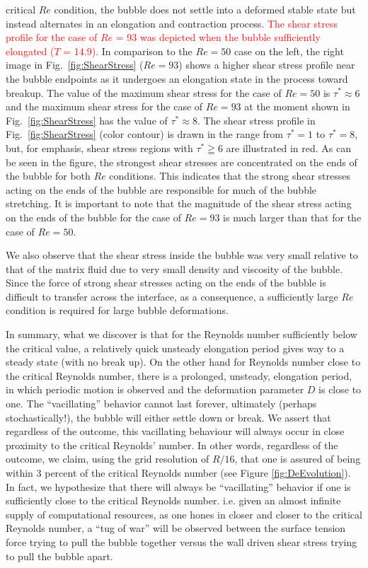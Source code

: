 \documentclass{elsarticle}
\begin{document}
critical $Re$ condition, the bubble does not settle into a deformed stable state but instead alternates in an elongation and 
contraction process.  
\textcolor{red}
{
The shear stress profile for the case of $Re$ = 93 was depicted when the bubble sufficiently elongated ($T$ = 14.9).
}
In comparison to the $Re=50$ case on the left, the right image in Fig.~\ref{fig:ShearStress} ($Re=93$) shows a higher 
shear stress profile near the bubble endpoints as it undergoes an elongation
state in the process toward breakup.
The value of the maximum shear stress for the case of $Re = 50$ is $\tau ^{\ast} \approx 6$ 
and the maximum shear stress for the case of $Re = 93$ at the moment 
shown in Fig.~\ref{fig:ShearStress} has the value of $\tau ^{\ast} \approx 8$.  
The shear stress profile in Fig.~\ref{fig:ShearStress} (color contour) is drawn in the range from 
$\tau^{\ast} = 1$ to $\tau ^{\ast} = 8$, but, for emphasis, shear stress regions
with $\tau ^{\ast} \geqq 6$ are illustrated in red.  
As can be seen in the figure, the strongest shear stresses are concentrated on the 
ends of the bubble for both $Re$ conditions.  
This indicates that the strong shear stresses acting on the ends of the bubble are responsible 
for much of the bubble stretching.
It is important to note that the magnitude of the shear stress acting on the
ends of the bubble for the case of $Re = 93$ is much larger than that for the
case of $Re = 50$.  

We also observe that the shear stress inside the bubble was very small
relative to that of the matrix fluid due to very small density and viscosity of
the bubble.  Since the force of strong shear stresses acting on the ends of the
bubble is difficult to transfer across the interface, as a consequence, a
sufficiently large $Re$ condition is required for large bubble deformations.  
\par\noindent
In summary, what we discover is that for the Reynolds
number sufficiently below the critical value, a relatively quick
unsteady elongation period gives way to a steady state (with no
break up).  On the other hand for Reynolds number close to the critical Reynolds
number, there is a prolonged, unsteady, elongation period, in which
periodic motion is observed and the deformation parameter $D$ is close 
to one.  The ``vacillating'' behavior cannot last forever, ultimately (perhaps stochastically!),
the bubble will either settle down or break.  We assert that regardless
of the outcome, this vacillating behaviour will always occur
in close proximity to the critical Reynolds' number.  In other words,
regardless of the outcome, we claim, using the grid resolution of
$R/16$, that one is assured of being within 
3 percent of the critical Reynolds number (see Figure \ref{fig:DeEvolution}).  
In fact,
we hypothesize that there will always be ``vacillating'' behavior
if one is sufficiently close to the critical Reynolds number.  i.e.
given an almost infinite supply of computational resources, as one hones
in closer and closer to the critical Reynolds number, a ``tug of war''
will be observed between the surface tension force trying to pull the
bubble together versus the wall driven shear stress trying to pull the
bubble apart.  
\end{document}
